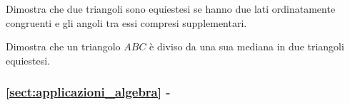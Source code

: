 \begin{multicols}{2}
\begin{esercizio}
\label{ese:7.8}
Dimostra che due triangoli sono equiestesi se hanno due lati ordinatamente congruenti e gli angoli tra essi compresi supplementari.
\end{esercizio}

\begin{esercizio}
\label{ese:7.9}
Dimostra che un triangolo $ABC$ è diviso da una sua mediana in due triangoli equiestesi.
\end{esercizio}

\end{multicols}

\begingroup
\hypersetup{linkcolor=black}
\subsubsection*{\ref{sect:applicazioni_algebra} - }
\endgroup

